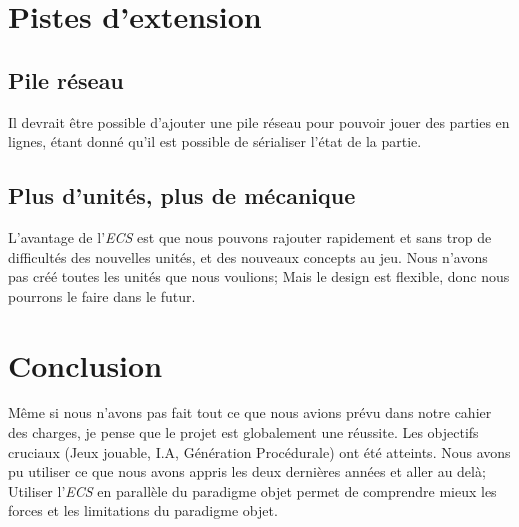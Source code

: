 \documentclass[french]{article}
\begin{document}
\section{Pistes d'extension}

\subsection{Pile réseau}
Il devrait être possible d'ajouter une pile réseau pour pouvoir jouer des parties en lignes, étant donné qu'il est possible de sérialiser l'état de la partie.

\subsection{Plus d'unités, plus de mécanique}

L'avantage de l'\textit{ECS} est que nous pouvons rajouter rapidement et sans trop de difficultés des nouvelles unités, et des nouveaux concepts au jeu. Nous n'avons pas créé toutes les unités que nous voulions; Mais le design est flexible, donc nous pourrons le faire dans le futur.

\section{Conclusion}
Même si nous n'avons pas fait tout ce que nous avions prévu dans notre cahier des charges, je pense que le projet est globalement une réussite. Les objectifs cruciaux (Jeux jouable, I.A, Génération Procédurale) ont été atteints. Nous avons pu utiliser ce que nous avons appris les deux dernières années et aller au delà; Utiliser l'\textit{ECS} en parallèle du paradigme objet permet de comprendre mieux les forces et les limitations du paradigme objet.
\end{document}
